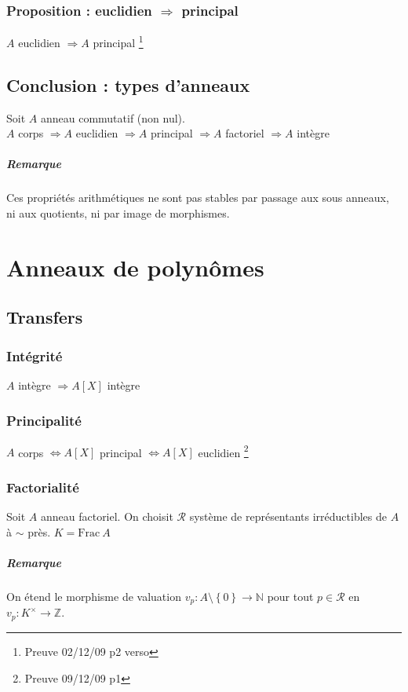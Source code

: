 \documentclass[reqno,a4paper,10pt]{report}
\newcommand{\set}[1]{\left\lbrace #1 \right\rbrace} %
\newcommand{\Frac}{\mathrm{Frac}\:} %
\newcommand{\IZ}{\ensuremath{\mathbb{Z}}\xspace} %
\newcommand{\IN}{\ensuremath{\mathbb{N}}\xspace} %
\newcommand{\so}{\Rightarrow}
\newcommand{\pfootnote}[1]{\up{(}\footnote{#1}\up{)}} %
\begin{document}
\subsection{Proposition : euclidien $\so$ principal}
$A$ euclidien $\so A$ principal
  \pfootnote{Preuve 02/12/09 p2 verso}

\section{Conclusion : types d'anneaux}
Soit $A$ anneau commutatif (non nul).\\
$A$ corps $\so A$ euclidien $\so A$ principal $\so A$ factoriel $\so A$ intègre

\paragraph{Remarque} Ces propriétés arithmétiques ne sont pas stables par
passage aux sous anneaux, ni aux quotients, ni par image de morphismes.

\chapter{Anneaux de polynômes}

\section{Transfers}
\subsection{Intégrité}
$A$ intègre $\so A[X]$ intègre

\subsection{Principalité}
$A$ corps $\iff A[X]$ principal $\iff A[X]$ euclidien
  \pfootnote{Preuve 09/12/09 p1}

\subsection{Factorialité}
Soit $A$ anneau factoriel. On choisit $\mathcal R$ système de représentants
irréductibles de $A$ à $\sim$ près.  $K=\Frac A$


\paragraph{Remarque}
On étend le morphisme de valuation $v_p : A\setminus\set{0} \to \IN$ pour tout
$p\in \mathcal R$ en $v_p:K^\times \to \IZ$.
\end{document}

